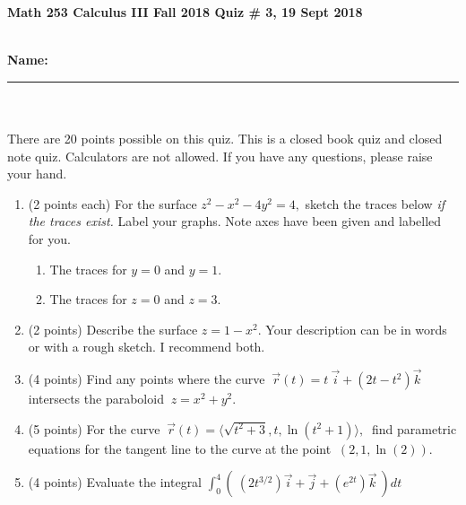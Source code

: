 \documentclass[11pt]{article}
\theoremstyle{remark}
\def\be{\begin{enumerate}}
\def\ee{\end{enumerate}}
\renewcommand{\d}{\displaystyle}
\begin{document}
{\bf Math 253 Calculus III Fall 2018 \hfill Quiz \# 3,  19 Sept 2018 }\\
\\
{\bf Name: \rule{3.5in}{1pt}}\\
\\
\noindent There are 20 points possible on this quiz. This is a closed
book quiz and closed note quiz. Calculators are not allowed. If you have any questions, please
raise your hand.

\begin{enumerate}
\item (2 points each) For the surface $z^2-x^2-4y^2 =4,$ sketch the traces below \emph{if the traces exist.} Label your graphs. Note axes have been given and labelled for you.
\begin{multicols}{2}
\be 
\item The traces for $y=0$ and $ y=1.$


\item The traces for $z=0$ and $z=3.$

\ee
\end{multicols}
\vspace{1in}
\item (2 points) Describe the surface $z=1-x^2.$ Your description can be in words or with a rough sketch. I recommend both.
\vfill
\newpage
\item (4 points) Find any points where the curve $\:\vec{r}(t)=t \: \vec{i} + (2t-t^2) \vec{k}\:$ intersects the paraboloid $\:z=x^2+y^2.\:$
\vfill
\item (5 points) For the curve $\:\vec{r}(t)= \langle \sqrt{t^2+3}, t, \ln(t^2+1) \rangle,\:$ find parametric equations for the tangent line to the curve at the point $\:(2,1,\ln(2)).$ 
\vfill
\item (4 points) Evaluate the integral $\d{\int_0^4 (\: (2t^{3/2}) \vec{i} + \vec{j}+(e^{2t} )\vec{k} \:) dt}$
\vfill
\end{enumerate}
\end{document}
